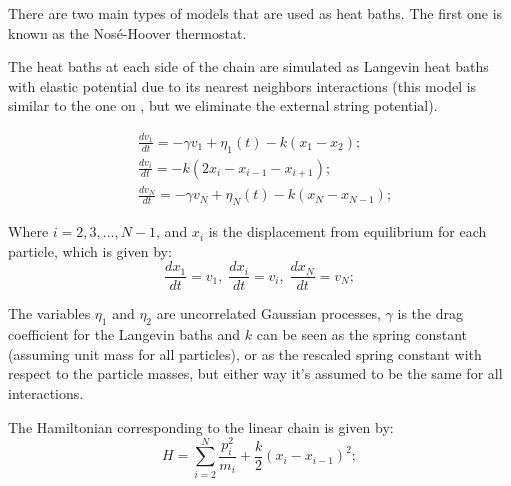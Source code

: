 There are two main types of models that are used as heat baths. The first one is known as the Nosé-Hoover thermostat.


The heat baths at each side of the chain are simulated as Langevin heat baths with elastic potential due to its nearest neighbors interactions (this model is similar to the one on , but we eliminate the external string potential).

\begin{equation}\label{eq:1}
\boxed{
	\begin{aligned}
	&\frac{d v_1}{dt} = -\gamma v_1 + \eta_1(t) -k\left(x_1 - x_2\right);\\
	&\frac{d v_i}{dt} = -k\left(2x_i - x_{i-1} - x_{i+1}\right);\\
	&\frac{d v_N}{dt} = -\gamma v_N + \eta_N(t) -k\left(x_N - x_{N-1}\right);
	\end{aligned}
}
\end{equation}

Where $i=2,3,...,N-1$, and $x_i$ is the displacement from equilibrium for each particle, which is given by:
$$\frac{d x_1}{dt} = v_1,\; \frac{d x_i}{dt} = v_i,\; \frac{d x_N}{dt} = v_N;$$

The variables $\eta_1$ and $\eta_2$ are uncorrelated Gaussian processes, $\gamma$ is the drag coefficient for the Langevin baths and $k$ can be seen as the spring constant (assuming unit mass for all particles), or as the rescaled spring constant with respect to the particle masses, but either way it's assumed to be the same for all interactions.

The Hamiltonian corresponding to the linear chain is given by:
$$H = \sum_{i=2}^{N} \frac{p_i^2}{m_i} + \frac{k}{2}(x_i-x_{i-1})^2;$$
%

